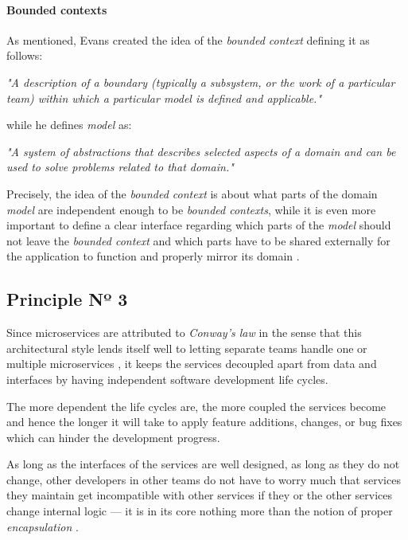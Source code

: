 \documentclass[12pt,a4paper]{report}
\begin{document}
\paragraph{Bounded contexts}
As mentioned, Evans created the idea of the \textit{bounded context} defining
it as follows:
\begin{displayquote}
\emph{"A description of a boundary
(typically a subsystem, or the work of a particular team)
within which a particular model is defined and applicable."}~\cite{evans2014ddd}
\end{displayquote}
while he defines \textit{model} as:
\begin{displayquote}
\emph{"A system of abstractions that describes selected aspects of a domain
and can be used to solve problems related to that domain."}~\cite{evans2014ddd}
\end{displayquote}
Precisely, the idea of the \textit{bounded context} is about what parts of the
domain \textit{model} are independent enough to be \textit{bounded contexts},
while it is even more important to define a clear interface regarding
which parts of the \textit{model} should not leave the \textit{bounded context}
and which parts have to be shared externally for the application to function
and properly mirror its domain \cite{newman2015building}.


\subsection{Principle Nº 3}
Since microservices are attributed to \textit{Conway's law}
\cite{ms-fowler, dragoni2017microservices, conway1968law}
in the sense that this architectural style lends itself well to letting
separate teams handle one or multiple microservices \cite{newman2015building},
it keeps the services decoupled apart from data and interfaces by having
independent software development life cycles.

The more dependent the life cycles are, the more coupled the services become
and hence the longer it will take to apply feature additions, changes,
or bug fixes which can hinder the development progress.

As long as the interfaces of the services are well designed,
as long as they do not change, other developers in other teams do not have
to worry much that services they maintain get incompatible with other services
if they or the other services change internal logic --- it is in its core
nothing more than the notion of proper \textit{encapsulation} \cite{ms-fowler}.
\end{document}
